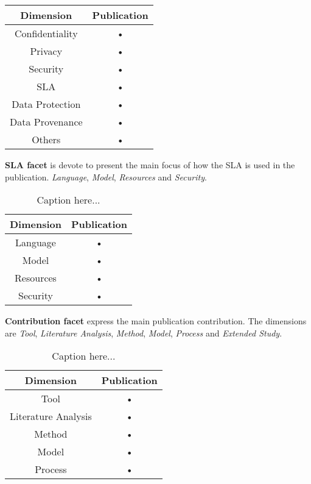 \begin{description}
\begin{table}[h]
\begin{center}
\begin{tabular}{|c|c|}
\hline 
\textbf{Dimension} & \textbf{Publication} \\ 
\hline 
Confidentiality & • \\ 
\hline 
Privacy & • \\ 
\hline 
Security & • \\ 
\hline 
SLA & • \\ 
\hline 
Data Protection & • \\ 
\hline 
Data Provenance & • \\ 
\hline 
Others & • \\ 
\hline 
\end{tabular}
\end{center}
\end{table}
\item \textbf{SLA facet} is devote to present the main focus of how the SLA is used in the publication.  \textit{Language}, \textit{Model}, \textit{Resources} and \textit{Security}.
\begin{table}[h]
\caption{Caption here...}
\begin{center}
\begin{tabular}{|c|c|}
\hline 
\textbf{Dimension} & \textbf{Publication} \\ 
\hline 
Language & • \\ 
\hline 
Model & • \\ 
\hline 
Resources & • \\ 
\hline 
Security & • \\ 
\hline 
\end{tabular}
\end{center}
\end{table}
\item \textbf{Contribution facet} express the main publication contribution. 
The dimensions are \textit{Tool}, \textit{Literature Analysis}, \textit{Method}, \textit{Model}, \textit{Process} and \textit{Extended Study}.
\begin{table}[h]
\caption{Caption here...}
\begin{center}
\begin{tabular}{|c|c|}
\hline 
\textbf{Dimension} & \textbf{Publication} \\ 
\hline 
Tool & • \\ 
\hline 
Literature Analysis & • \\ 
\hline 
Method & • \\ 
\hline 
Model & • \\ 
\hline 
Process & • \\ 

\end{tabular}
\end{center}
\end{table}
\end{description}
